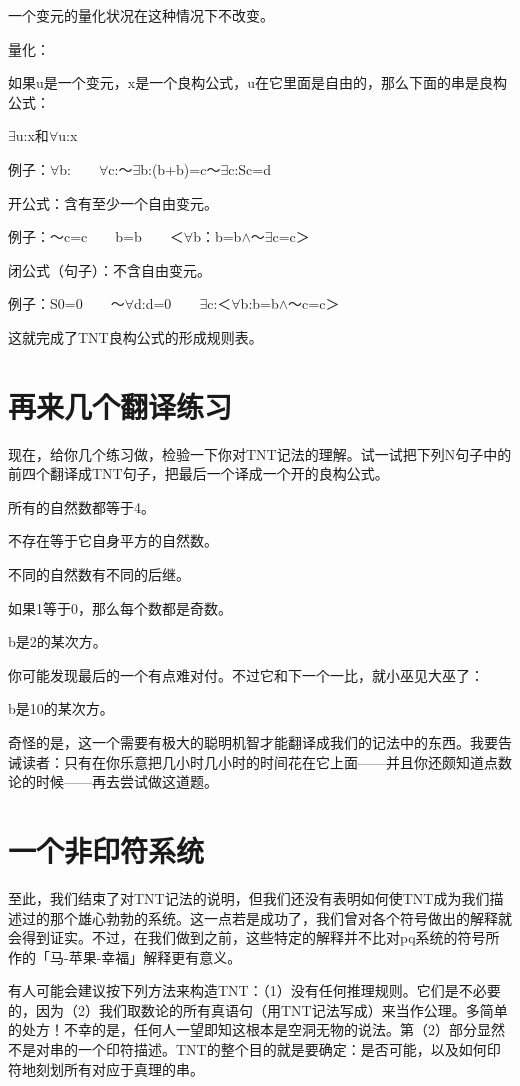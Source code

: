 \documentclass[
  12pt,
  twoside,
  openright,
  oldfontcommands,
]{memoir}
\begin{document}
一个变元的量化状况在这种情况下不改变。

量化：

如果u是一个变元，x是一个良构公式，u在它里面是自由的，那么下面的串是良构公式：

$\exists$u:x和$\forall$u:x

例子：$\forall$b:　　$\forall$c:～$\exists$b:(b+b)=c～$\exists$c:Sc=d

开公式：含有至少一个自由变元。

例子：～c=c　　b=b　　＜$\forall$b：b=b$\wedge$～$\exists$c=c＞

闭公式（句子）：不含自由变元。

例子：S0=0　　～$\forall$d:d=0　　$\exists$c:＜$\forall$b:b=b$\wedge$～c=c＞

这就完成了TNT良构公式的形成规则表。

\section{再来几个翻译练习}

现在，给你几个练习做，检验一下你对TNT记法的理解。试一试把下列N句子中的前四个翻译成TNT句子，把最后一个译成一个开的良构公式。

所有的自然数都等于4。

不存在等于它自身平方的自然数。

不同的自然数有不同的后继。

如果1等于0，那么每个数都是奇数。

b是2的某次方。

你可能发现最后的一个有点难对付。不过它和下一个一比，就小巫见大巫了：

b是10的某次方。

奇怪的是，这一个需要有极大的聪明机智才能翻译成我们的记法中的东西。我要告诫读者：只有在你乐意把几小时几小时的时间花在它上面------并且你还颇知道点数论的时候------再去尝试做这道题。

\section{一个非印符系统}

至此，我们结束了对TNT记法的说明，但我们还没有表明如何使TNT成为我们描述过的那个雄心勃勃的系统。这一点若是成功了，我们曾对各个符号做出的解释就会得到证实。不过，在我们做到之前，这些特定的解释并不比对pq系统的符号所作的「马-苹果-幸福」解释更有意义。

有人可能会建议按下列方法来构造TNT：（1）没有任何推理规则。它们是不必要的，因为（2）我们取数论的所有真语句（用TNT记法写成）来当作公理。多简单的处方！不幸的是，任何人一望即知这根本是空洞无物的说法。第（2）部分显然不是对串的一个印符描述。TNT的整个目的就是要确定：是否可能，以及如何印符地刻划所有对应于真理的串。
\end{document}
